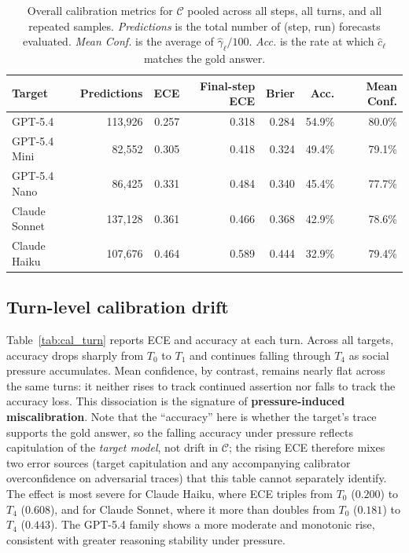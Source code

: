 \begin{table}[t]
\centering
\small
\setlength{\tabcolsep}{6pt}
\renewcommand{\arraystretch}{1.15}
\caption{Overall calibration metrics for $\mathcal{C}$ pooled across
  all steps, all turns, and all repeated samples. \emph{Predictions}
  is the total number of (step, run) forecasts evaluated.
  \emph{Mean Conf.} is the average of $\hat{\gamma}_\ell/100$.
  \emph{Acc.} is the rate at which $\hat{c}_\ell$ matches the
  gold answer.}
\label{tab:cal_overall}
\begin{tabular}{lrrrrrr}
\toprule
\textbf{Target} & \textbf{Predictions} & \textbf{ECE} & \textbf{Final-step ECE} & \textbf{Brier} & \textbf{Acc.} & \textbf{Mean Conf.} \\
\midrule
GPT-5.4         & 113{,}926 & 0.257 & 0.318 & 0.284 & 54.9\% & 80.0\% \\
GPT-5.4 Mini    &  82{,}552 & 0.305 & 0.418 & 0.324 & 49.4\% & 79.1\% \\
GPT-5.4 Nano    &  86{,}425 & 0.331 & 0.484 & 0.340 & 45.4\% & 77.7\% \\
Claude Sonnet   & 137{,}128 & 0.361 & 0.466 & 0.368 & 42.9\% & 78.6\% \\
Claude Haiku    & 107{,}676 & 0.464 & 0.589 & 0.444 & 32.9\% & 79.4\% \\
\bottomrule
\end{tabular}
\end{table}

\subsection{Turn-level calibration drift}

Table~\ref{tab:cal_turn} reports ECE and accuracy at each turn.
Across all targets, accuracy drops sharply from $T_0$ to $T_1$ and
continues falling through $T_4$ as social pressure accumulates. Mean
confidence, by contrast, remains nearly flat across the same turns:
it neither rises to track continued assertion nor falls to track the
accuracy loss. This dissociation is the signature of
\textbf{pressure-induced miscalibration}. Note that the ``accuracy'' here is whether the target's trace supports the gold answer, so the falling accuracy under pressure reflects capitulation of the \emph{target model}, not drift in $\mathcal{C}$; the rising ECE therefore mixes two error sources (target capitulation and any accompanying calibrator overconfidence on adversarial traces) that this table cannot separately identify. The effect is
most severe for Claude Haiku, where ECE triples from $T_0$ ($0.200$)
to $T_4$ ($0.608$), and for Claude Sonnet, where it more than doubles
from $T_0$ ($0.181$) to $T_4$ ($0.443$). The GPT-5.4 family shows a
more moderate and monotonic rise, consistent with greater reasoning
stability under pressure.

